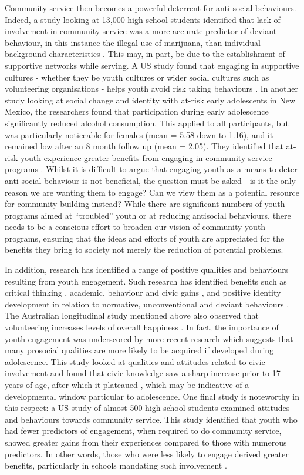 Community service then becomes a powerful deterrent for anti-social behaviours. Indeed, a study looking at 13,000 high school students identified that lack of involvement in community service was a more accurate predictor of deviant behaviour, in this instance the illegal use of marijuana, than individual background characteristics \citep{Youniss1999}. This may, in part, be due to the establishment of supportive networks while serving. A US study found that engaging in supportive cultures - whether they be youth cultures or wider social cultures such as volunteering organisations - helps youth avoid risk taking behaviours \citep{Kerestes2004}. In another study looking at social change and identity with at-risk early adolescents in New Mexico, the researchers found that participation during early adolescence significantly reduced alcohol consumption. This applied to all participants, but was particularly noticeable for females (mean = 5.58 down to 1.16), and it remained low after an 8 month follow up (mean = 2.05). They identified that at-risk youth experience greater benefits from engaging in community service programs \citep{Verlande2002}. Whilst it is difficult to argue that engaging youth as a means to deter anti-social behaviour is not beneficial, the question must be asked - is it the only reason we are wanting them to engage? Can we view them as a potential resource for community building instead? While there are significant numbers of youth programs aimed at “troubled” youth or at reducing antisocial behaviours, there needs to be a conscious effort to broaden our vision of community youth programs, ensuring that the ideas and efforts of youth are appreciated for the benefits they bring to society not merely the reduction of potential problems. 

In addition, research has identified a range of positive qualities and behaviours resulting from youth engagement. Such research has identified benefits such as critical thinking \citep{Gellin2003}, academic, behaviour and civic gains \citep{Schmidt2007}, and positive identity development in relation to normative, unconventional and deviant behaviours \citep{Youniss1999}. The Australian longitudinal study mentioned above also observed that volunteering increases levels of overall happiness \citep{Brown2003}. In fact, the importance of youth engagement was underscored by more recent research which suggests that many prosocial qualities are more likely to be acquired if developed during adolescence. This study looked at qualities and attitudes related to civic involvement and found that civic knowledge saw a sharp increase prior to 17 years of age, after which it plateaued \citep{Hart2011}, which may be indicative of a developmental window particular to adolescence. One final study is noteworthy in this respect: a US study of almost 500 high school students examined attitudes and behaviours towards community service. This study identified that youth who had fewer predictors of engagement, when required to do community service, showed greater gains from their experiences compared to those with numerous predictors. In other words, those who were less likely to engage derived greater benefits, particularly in schools mandating such involvement \citep{Metz2005}. 




